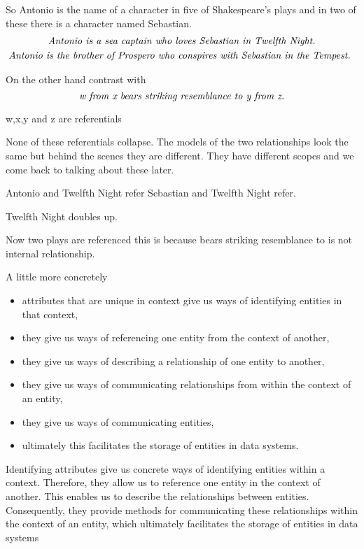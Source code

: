 So Antonio is the name of a character in five of Shakespeare's plays and in two of these there is a character named Sebastian. 
\begin{multline}
\mbox{\textit{Antonio  is a sea captain who loves  Sebastian in Twelfth Night.}} \\
\mbox{\textit{Antonio  is the brother of Prospero who conspires with Sebastian in the Tempest.} }
\end{multline}

On the other hand contrast with
\begin{equation}
\mbox{\textit{w from x bears striking resemblance to y from z.}}
\end{equation}

w,x,y and z are referentials

None of these referentials collapse. The models of the two relationships
look the same but behind the scenes they are different. They have different scopes and we come back to talking about these later.

Antonio and Twelfth Night refer
Sebastian and Twelfth Night refer.

Twelfth Night doubles up.

Now two plays are referenced this is because bears striking resemblance to is not internal relationship.

\mynote A little more concretely 
\begin{itemize}
\item attributes that are unique in context give us ways of identifying entities in that context, 
\item they give us ways of referencing one entity from the context of another, 
\item they give us ways of describing a relationship of one entity to another,
\item they give us ways of communicating relationships from within the context of an entity,
\item they give us ways of communicating entities, 
\item ultimately this facilitates the storage of entities in data systems. 
\end{itemize}

\mynote
Identifying attributes give us concrete ways of identifying entities within a context. Therefore, they allow us to reference one entity in the context of another. This enables us to describe the relationships between entities. Consequently, they provide methods for communicating these relationships within the context of an entity, which ultimately facilitates the storage of entities in data systems

